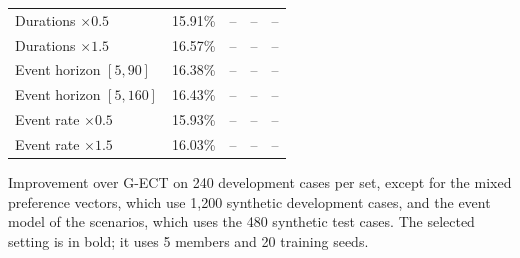 \begin{table}
\begin{threeparttable}
\begin{tabular*}{\textwidth}{@{\extracolsep{\fill}}lrrrr@{}}
Durations $\times0.5$ & 15.91\% & -- & -- & -- \\
Durations $\times1.5$ & 16.57\% & -- & -- & -- \\
Event horizon $[5,90]$ & 16.38\% & -- & -- & -- \\
Event horizon $[5,160]$ & 16.43\% & -- & -- & -- \\
Event rate $\times0.5$ & 15.93\% & -- & -- & -- \\
Event rate $\times1.5$ & 16.03\% & -- & -- & -- \\
\bottomrule
\end{tabular*}
\begin{tablenotes}\footnotesize
\item Improvement over G-ECT on 240 development cases per set, except for the mixed preference vectors, which use 1{,}200 synthetic development cases, and the event model of the scenarios, which uses the 480 synthetic test cases. The selected setting is in bold; it uses 5 members and 20 training seeds.
\end{tablenotes}
\end{threeparttable}
\end{table}
